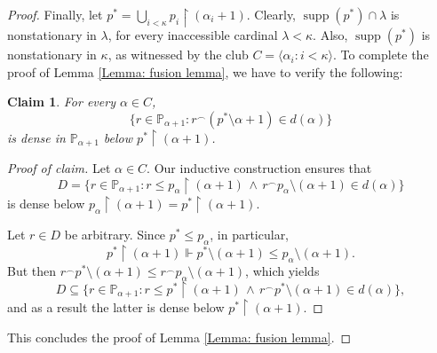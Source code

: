 \documentclass[10pt,a4paper]{amsart}
\newtheorem{claim}{Claim}
\def\forces{\Vdash}
\newcommand{\po}{\mathbb{P}}
\renewcommand{\restriction}{\mathbin\upharpoonright}    %
\def\s{\subseteq}
\DeclareMathOperator{\supp}{supp}
\begin{document}
\begin{proof}
    
    Finally, let $p^* =\bigcup_{i<\kappa} p_i\restriction (\alpha_i+1)$. {Clearly, $\supp(p^*)\cap \lambda$ is nonstationary in $\lambda$, for every inaccessible cardinal $\lambda<\kappa$.} Also, $\supp(p^*)$ is nonstationary in $\kappa$, as witnessed by the club  $C =\langle \alpha_i \colon i<\kappa \rangle$. To complete the proof of Lemma \ref{Lemma: fusion lemma}, we have to verify the following:
    \begin{claim}
     For every $\alpha\in C$, 
    $$\{ r\in \po_{\alpha+1} \colon r^{\smallfrown} (p^*\setminus \alpha+1) \in d(\alpha) \}$$
    is dense in $\po_{\alpha+1}$ below $p^*\restriction (\alpha+1)$.
    \end{claim}
    \begin{proof}[Proof of claim]
        Let $\alpha\in C$. Our inductive construction ensures that $$D=\{r\in \mathbb{P}_{\alpha+1}\colon r\leq p_\alpha\restriction (\alpha+1)\,\wedge\, r{}^\smallfrown p_{\alpha}\setminus (\alpha+1)\in d(\alpha)\}$$
        is dense below $p_{\alpha}\restriction (\alpha+1)=p^*\restriction(\alpha+1).$
        
        Let $r\in D$ be arbitrary. Since $p^*\leq p_\alpha$, in particular,  $$p^*\restriction (\alpha+1)\forces p^*\setminus (\alpha+1)\leq p_\alpha\setminus (\alpha+1).$$
        But then $r{}^\smallfrown p^*\setminus (\alpha+1)\leq r{}^\smallfrown p_\alpha\setminus (\alpha+1)$, which yields
        $$D\s \{r\in \mathbb{P}_{\alpha+1}\colon r\leq p^*\restriction(\alpha+1)\,\wedge\, r{}^\smallfrown p^*\setminus (\alpha+1)\in d(\alpha)\},$$
        and as a result the latter is dense below $p^*\restriction (\alpha+1).$
    \end{proof}
    This concludes the proof of Lemma \ref{Lemma: fusion lemma}.
\end{proof}
\end{document}
